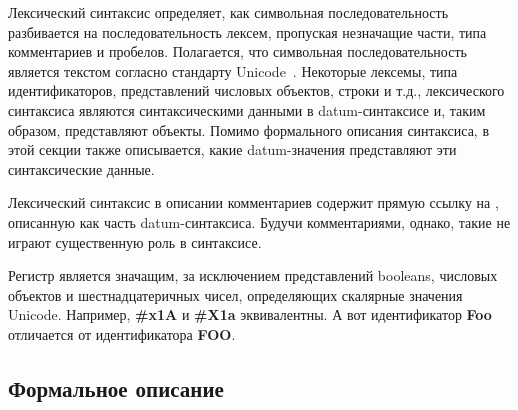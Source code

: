 Лексический синтаксис определяет, как символьная последовательность разбивается на
последовательность лексем, пропуская незначащие части, типа комментариев и
пробелов. Полагается, что символьная последовательность является текстом согласно стандарту
Unicode~\cite{Unicode}. Некоторые лексемы, типа идентификаторов, представлений числовых объектов,
строки и т.д., лексического синтаксиса являются синтаксическими данными в datum-синтаксисе
и, таким образом, представляют объекты. Помимо формального описания синтаксиса, в этой
секции также описывается, какие datum-значения представляют эти синтаксические
данные.

Лексический синтаксис в описании комментариев содержит прямую ссылку на ,
описанную как часть datum-синтаксиса. Будучи комментариями, однако,
такие  не играют существенную роль в синтаксисе.

Регистр является значащим, за исключением представлений booleans, числовых объектов и
шестнадцатеричных чисел, определяющих скалярные значения Unicode. Например, {\cf\bfseries \#x1A}
и {\cf\bfseries \#X1a} эквивалентны. А вот идентификатор {\cf\bfseries Foo} отличается от
идентификатора {\cf\bfseries FOO}.

\subsection{Формальное описание}
\label{lexicalgrammarsection}

